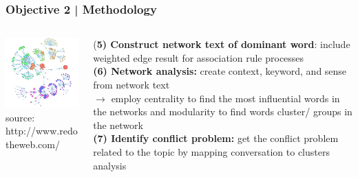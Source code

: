 \documentclass{beamer}
\begin{document}
\begin{frame}
\frametitle{Objective 2 | Methodology}
\begin{columns}
	\begin{column}{.45\textwidth}
		\includegraphics[width=50mm]{tn.png}\\
	{\tiny 	source: http://www.redotheweb.com/}
	\end{column}

	\begin{column}{.65\textwidth}
(\textbf{5) Construct network text of dominant word}: include weighted edge result for association rule processes\\
\textbf{(6) Network analysis:} create context, keyword, and sense from network text\\
$\rightarrow$ employ centrality to find the most influential words in the networks and modularity to find words cluster/ groups in the network \\
\textbf{(7) Identify conflict problem:} get the conflict problem related to the topic by mapping conversation to clusters analysis\\
	\end{column}
\end{columns}
\end{frame}
\end{document}
